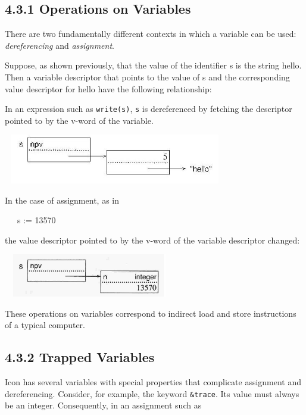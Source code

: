 \subsection[4.3.1 Operations on Variables]{4.3.1 Operations on Variables}

There are two fundamentally different contexts in which a variable can
be used: \textit{dereferencing} and \textit{assignment}.

Suppose, as shown previously, that the value of the identifier s is
the string {\textquotedbl}hello{\textquotedbl}. Then a variable
descriptor that points to the value of s and the corresponding value
descriptor for {\textquotedbl}hello{\textquotedbl} have the following
relationship:

In an expression such as \texttt{write(s)}, \texttt{s} is dereferenced
by fetching the descriptor pointed to by the v-word of the variable.

\begin{center}
\includegraphics[width=3.8492in,height=0.8492in]{ib-img/ib-img015.jpg}
\end{center}

In the case of assignment, as in

{\ttfamily\mdseries
\ \ \ s := 13570}

\noindent the value descriptor pointed to by the v-word of the
variable descriptor changed:

\ \  \includegraphics[width=2.6717in,height=0.7374in]{ib-img/ib-img016.jpg} 

These operations on variables correspond to indirect load and store
instructions of a typical computer.

\subsection[4.3.2 Trapped Variables]{4.3.2 Trapped Variables}

Icon has several variables with special properties that complicate
assignment and dereferencing. Consider, for example, the keyword
\texttt{\&trace}. Its value must always be an integer. Consequently,
in an assignment such as


